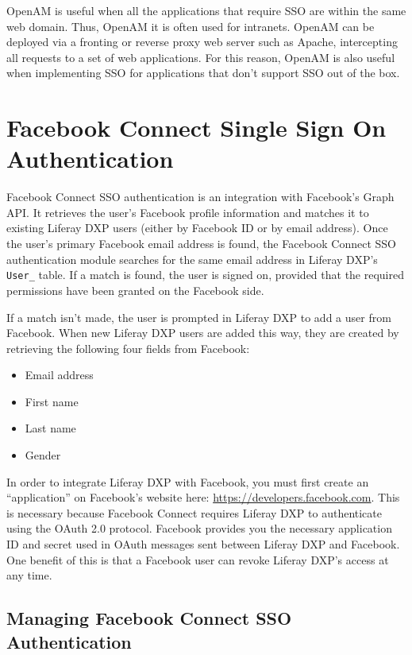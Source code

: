 OpenAM is useful when all the applications that require SSO are within
the same web domain. Thus, OpenAM it is often used for intranets. OpenAM
can be deployed via a fronting or reverse proxy web server such as
Apache, intercepting all requests to a set of web applications. For this
reason, OpenAM is also useful when implementing SSO for applications
that don't support SSO out of the box.

\section{Facebook Connect Single Sign On
Authentication}\label{facebook-connect-single-sign-on-authentication}

Facebook Connect SSO authentication is an integration with Facebook's
Graph API. It retrieves the user's Facebook profile information and
matches it to existing Liferay DXP users (either by Facebook ID or by
email address). Once the user's primary Facebook email address is found,
the Facebook Connect SSO authentication module searches for the same
email address in Liferay DXP's \texttt{User\_} table. If a match is
found, the user is signed on, provided that the required permissions
have been granted on the Facebook side.

If a match isn't made, the user is prompted in Liferay DXP to add a user
from Facebook. When new Liferay DXP users are added this way, they are
created by retrieving the following four fields from Facebook:

\begin{itemize}
\tightlist
\item
  Email address
\item
  First name
\item
  Last name
\item
  Gender
\end{itemize}

In order to integrate Liferay DXP with Facebook, you must first create
an ``application'' on Facebook's website here:
\url{https://developers.facebook.com}. This is necessary because
Facebook Connect requires Liferay DXP to authenticate using the OAuth
2.0 protocol. Facebook provides you the necessary application ID and
secret used in OAuth messages sent between Liferay DXP and Facebook. One
benefit of this is that a Facebook user can revoke Liferay DXP's access
at any time.

\subsection{Managing Facebook Connect SSO
Authentication}\label{managing-facebook-connect-sso-authentication}

